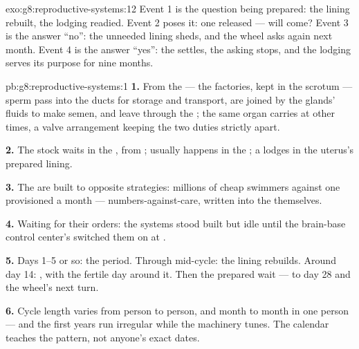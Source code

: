 \begin{solution}{exo:g8:reproductive-systems:12}
Event 1 is the question being prepared: the lining
rebuilt, the lodging readied. Event 2 poses it: one  released --- will  come? Event 3 is the
answer ``no'': the unneeded lining sheds, and the wheel
asks again next month. Event 4 is the answer ``yes'': the
 settles, the asking stops, and the lodging serves
its purpose for nine months.
\end{solution}

\begin{solution}{pb:g8:reproductive-systems:1}
\textbf{1.} From the  --- the factories, kept in the
scrotum --- sperm pass into the ducts for storage and
transport, are joined by the glands' fluids to make semen,
and leave through the ; the same organ carries 
at other times, a valve arrangement keeping the two duties
strictly apart.

\textbf{2.} The stock waits in the , from ;
 usually happens in the ; a 
lodges in the uterus's prepared lining.

\textbf{3.} The  are built to opposite strategies:
millions of cheap swimmers against one provisioned  a
month --- numbers-against-care, written into the 
themselves.

\textbf{4.} Waiting for their orders: the systems stood
built but idle until the brain-base control center's
 switched them on at .

\textbf{5.} Days 1--5 or so: the period. Through mid-cycle:
the lining rebuilds. Around day 14: , with the
fertile day around it. Then the prepared wait --- to day
28 and the wheel's next turn.

\textbf{6.} Cycle length varies from person to person, and
month to month in one person --- and the first years run
irregular while the machinery tunes. The calendar teaches
the pattern, not anyone's exact dates.


\end{solution}
